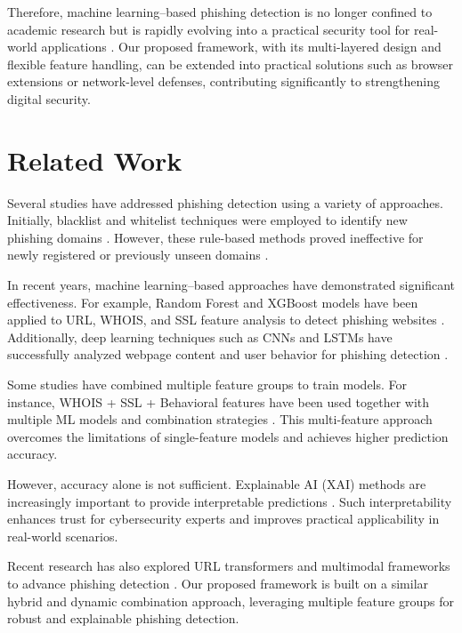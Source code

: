 \documentclass[conference]{IEEEtran}
\begin{document}
Therefore, machine learning–based phishing detection is no longer confined to academic research but is rapidly evolving into a practical security tool for real-world applications \cite{wikipedia2025applicationsAI}. Our proposed framework, with its multi-layered design and flexible feature handling, can be extended into practical solutions such as browser extensions or network-level defenses, contributing significantly to strengthening digital security. 

\section{Related Work}
Several studies have addressed phishing detection using a variety of approaches. Initially, blacklist and whitelist techniques were employed to identify new phishing domains \cite{academia2022mlphishing}. However, these rule-based methods proved ineffective for newly registered or previously unseen domains \cite{sciencedirect2022noveldataset}.

In recent years, machine learning–based approaches have demonstrated significant effectiveness. For example, Random Forest and XGBoost models have been applied to URL, WHOIS, and SSL feature analysis to detect phishing websites \cite{oni2024phishing, mdpi2022improved}. Additionally, deep learning techniques such as CNNs and LSTMs have successfully analyzed webpage content and user behavior for phishing detection \cite{academia2020cnn}.

Some studies have combined multiple feature groups to train models. For instance, WHOIS + SSL + Behavioral features have been used together with multiple ML models and combination strategies \cite{frontiers2025multimodal, academia2021urltran}. This multi-feature approach overcomes the limitations of single-feature models and achieves higher prediction accuracy.

However, accuracy alone is not sufficient. Explainable AI (XAI) methods are increasingly important to provide interpretable predictions \cite{wiley2022explainable, arxiv2024featureimportance}. Such interpretability enhances trust for cybersecurity experts and improves practical applicability in real-world scenarios.

Recent research has also explored URL transformers and multimodal frameworks to advance phishing detection \cite{academia2021urltran, frontiers2025multimodal}. Our proposed framework is built on a similar hybrid and dynamic combination approach, leveraging multiple feature groups for robust and explainable phishing detection.
\end{document}
